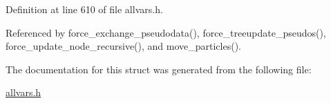 Definition at line 610 of file allvars.h.



Referenced by force\_\-exchange\_\-pseudodata(), force\_\-treeupdate\_\-pseudos(), force\_\-update\_\-node\_\-recursive(), and move\_\-particles().



The documentation for this struct was generated from the following file:\begin{DoxyCompactItemize}
\item 
\hyperlink{allvars_8h}{allvars.h}\end{DoxyCompactItemize}
